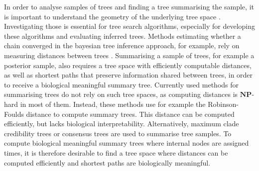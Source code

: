 \documentclass[11pt]{amsart}
\newcommand{\rnni}{\mathrm{RNNI}}
\newcommand{\dtt}{\mathrm{DCT}}
\newcommand{\np}{\mathbf{NP}}
\newcommand{\summary}[1]{} %
\begin{document}
\summary{Why we want to investigate geometrical properties of $\dtt_m$ and $\rnni$}
In order to analyse samples of trees and finding a tree summarising the sample, it is important to understand the geometry of the underlying tree space \autocite{Benner2014-mx}.
Investigating those is essential for tree search algorithms, especially for developing these algorithms and evaluating inferred trees.
Methods estimating whether a chain converged in the bayesian tree inference approach, for example, rely on measuring distances between trees \autocite{Nylander2008-wa, Warren2017-df}.
Summarising a sample of trees, for example a posterior sample, also requires a tree space with efficiently computable distances, as well as shortest paths that preserve information shared between trees, in order to receive a biological meaningful summary tree.
Currently used methods for summarising trees do not rely on such tree spaces, as computing distances is $\np$-hard in most of them.
Instead, these methods use for example the Robinson-Foulds distance \autocite{Robinson1981-fb, Bansal2010-vr} to compute summary trees.
This distance can be computed efficiently, but lacks biological interpretability.
Alternatively, maximum clade credibility trees \autocite{Heled2013-sv} or consensus trees \autocite{Margush1981-ba} are used to summarise tree samples.
To compute biological meaningful summary trees where internal nodes are assigned times, it is therefore desirable to find a tree space where distances can be computed efficiently and shortest paths are biologically meaningful.
\end{document}
